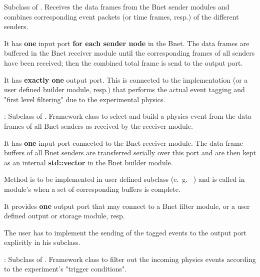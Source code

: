 \begin{description}
Subclass of . 
   Receives the data frames from the Bnet sender modules and 
   combines corresponding event packets (or time frames, resp.) of the different senders.
\begin{compactenum}
  \item It has {\bf one} input port {\bf for each sender node} in the Bnet. 
      The data frames are buffered in the Bnet receiver module until the 
      corresponding frames of all senders have been received; then the 
      combined total frame is send to the output port.
  \item It has {\bf exactly one} output port. This is connected to the 
       implementation (or a user defined builder module, resp.) 
      that performs the actual event tagging and "first level filtering" 
      due to the experimental physics.   
\end{compactenum}
\item[\class{bnet::BuilderModule}] : 
	Subclass of . 
   Framework class to select and build a physics event from 
   the data frames of all Bnet senders as received by the receiver module.
\begin{compactenum}
  \item It has {\bf one} input port connected to the Bnet receiver module. 
      The data frame buffers of all Bnet senders are transferred serially 
      over this port and are then kept as an internal {\bf std::vector} in the Bnet builder module.
  \item Method  is to be implemented in user defined 
      subclass (e.~g.~ ) and is called in module's 
       when a set of corresponding buffers is complete.
  \item It provides {\bf one} output port that may connect to a 
      Bnet filter module, or a user defined output or storage module, resp. 
  \item The user has to implement the sending of the tagged 
      events to the output port explicitly in his subclass. 
\end{compactenum}
\item[\class{bnet::FilterModule}] : 
Subclass of . 
   Framework class to filter out the incoming physics events 
   according to the experiment's "trigger conditions". 

\end{description}
